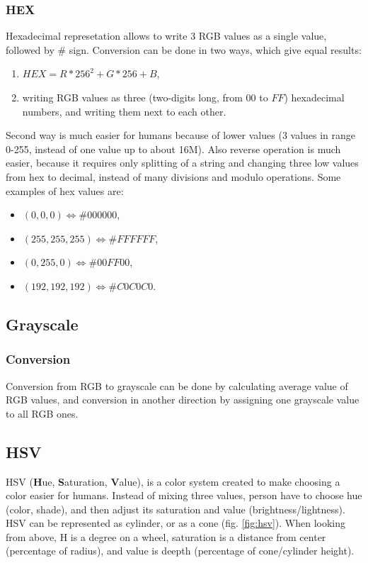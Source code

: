 \documentclass[titlepage]{article}
\begin{document}
\subsubsection{HEX}
Hexadecimal represetation allows to write 3 RGB values as a single value,
followed by \# sign. Conversion can be done in two ways, which give equal
results:
\begin{enumerate}
  \item $HEX=R*256^2+G*256+B$,
  \item writing RGB values as three (two-digits long, from $00$ to $FF$)
  hexadecimal numbers, and writing them next to each other.
\end{enumerate}
Second way is much easier for humans because of lower values (3 values in
range 0-255, instead of one value up to about 16M). Also reverse operation
is much easier, because it requires only splitting of a string and changing
three low values from hex to decimal, instead of many divisions and modulo
operations. Some examples of hex values are:
\begin{itemize}
  \item $(0, 0, 0) \Leftrightarrow \#000000$,
  \item $(255, 255, 255) \Leftrightarrow \#FFFFFF$,
  \item $(0, 255, 0) \Leftrightarrow \#00FF00$,
  \item $(192, 192, 192) \Leftrightarrow \#C0C0C0$.
\end{itemize}

\subsection{Grayscale}
\subsubsection{Conversion}
Conversion from RGB to grayscale can be done by calculating average value of RGB
values, and conversion in another direction by assigning one grayscale value to
all RGB ones.

\subsection{HSV}
HSV (\textbf{H}ue, \textbf{S}aturation, \textbf{V}alue), is a color system
created to make choosing a color easier for humans. Instead of mixing three
values, person have to choose hue (color, shade), and then adjust its saturation
and value (brightness/lightness). HSV can be represented as cylinder, or as a
cone (fig. \ref{fig:hsv}). When looking from above, H is a degree on a wheel,
saturation is a distance from center (percentage of radius), and
value is deepth (percentage of cone/cylinder height).
\end{document}
